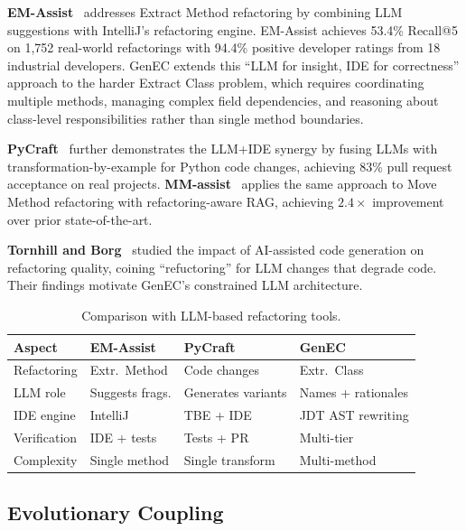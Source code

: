 \documentclass[sigconf]{acmart}
\begin{document}
\textbf{EM-Assist}~\cite{Pomian2024EMAssist} addresses Extract Method
refactoring by combining LLM suggestions with IntelliJ's refactoring engine.
EM-Assist achieves 53.4\% Recall@5 on 1,752 real-world refactorings with
94.4\% positive developer ratings from 18 industrial developers. GenEC extends
this ``LLM for insight, IDE for correctness'' approach to the harder Extract
Class problem, which requires coordinating multiple methods, managing complex
field dependencies, and reasoning about class-level responsibilities rather than
single method boundaries.

\textbf{PyCraft}~\cite{Dilhara2024PyCraft} further demonstrates the LLM+IDE
synergy by fusing LLMs with transformation-by-example for Python code changes,
achieving 83\% pull request acceptance on real projects.
\textbf{MM-assist}~\cite{Xu2025MoveMethod} applies the same approach to
Move Method refactoring with refactoring-aware RAG, achieving $2.4\times$
improvement over prior state-of-the-art.

\textbf{Tornhill and Borg}~\cite{cassee2024refuctoring} studied the impact of
AI-assisted code generation on refactoring quality, coining ``refuctoring'' for
LLM changes that degrade code. Their findings motivate GenEC's constrained LLM
architecture.

\begin{table}[t]
\centering\small
\caption{Comparison with LLM-based refactoring tools.}
\label{tab:rw-llm}
\begin{tabularx}{\columnwidth}{@{}lXXX@{}}
\toprule
\textbf{Aspect} & \textbf{EM-Assist} & \textbf{PyCraft} & \textbf{GenEC} \\
\midrule
Refactoring    & Extr.\ Method   & Code changes     & Extr.\ Class \\
LLM role       & Suggests frags. & Generates variants & Names + rationales \\
IDE engine     & IntelliJ        & TBE + IDE        & JDT AST rewriting \\
Verification   & IDE + tests     & Tests + PR       & Multi-tier \\
Complexity     & Single method   & Single transform & Multi-method \\
\bottomrule
\end{tabularx}
\end{table}

\subsection{Evolutionary Coupling}
\label{sec:rw-evo}
\end{document}
